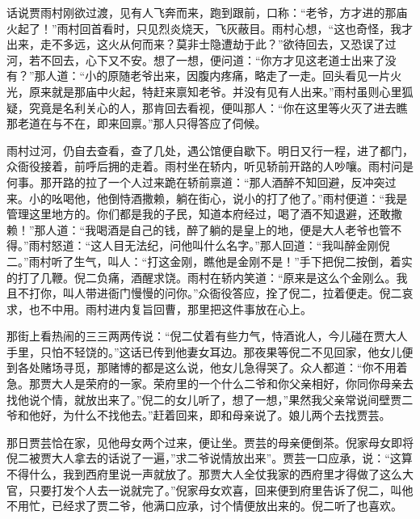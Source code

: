 


\begin{parag}
    话说贾雨村刚欲过渡，见有人飞奔而来，跑到跟前，口称：“老爷，方才进的那庙火起了！”雨村回首看时，只见烈炎烧天，飞灰蔽目。雨村心想，“这也奇怪，我才出来，走不多远，这火从何而来？莫非士隐遭劫于此？”欲待回去，又恐误了过河，若不回去，心下又不安。想了一想，便问道：“你方才见这老道士出来了没有？”那人道：“小的原随老爷出来，因腹内疼痛，略走了一走。回头看见一片火光，原来就是那庙中火起，特赶来禀知老爷。并没有见有人出来。”雨村虽则心里狐疑，究竟是名利关心的人，那肯回去看视，便叫那人：“你在这里等火灭了进去瞧那老道在与不在，即来回禀。”那人只得答应了伺候。
\end{parag}


\begin{parag}
    雨村过河，仍自去查看，查了几处，遇公馆便自歇下。明日又行一程，进了都门，众衙役接着，前呼后拥的走着。雨村坐在轿内，听见轿前开路的人吵嚷。雨村问是何事。那开路的拉了一个人过来跪在轿前禀道：“那人酒醉不知回避，反冲突过来。小的吆喝他，他倒恃酒撒赖，躺在街心，说小的打了他了。”雨村便道：“我是管理这里地方的。你们都是我的子民，知道本府经过，喝了酒不知退避，还敢撒赖！”那人道：“我喝酒是自己的钱，醉了躺的是皇上的地，便是大人老爷也管不得。”雨村怒道：“这人目无法纪，问他叫什么名字。”那人回道：“我叫醉金刚倪二。”雨村听了生气，叫人：“打这金刚，瞧他是金刚不是！”手下把倪二按倒，着实的打了几鞭。倪二负痛，酒醒求饶。雨村在轿内笑道：“原来是这么个金刚么。我且不打你，叫人带进衙门慢慢的问你。”众衙役答应，拴了倪二，拉着便走。倪二哀求，也不中用。雨村进内复旨回曹，那里把这件事放在心上。
\end{parag}


\begin{parag}
    那街上看热闹的三三两两传说：“倪二仗着有些力气，恃酒讹人，今儿碰在贾大人手里，只怕不轻饶的。”这话已传到他妻女耳边。那夜果等倪二不见回家，他女儿便到各处赌场寻觅，那赌博的都是这么说，他女儿急得哭了。众人都道：“你不用着急。那贾大人是荣府的一家。荣府里的一个什么二爷和你父亲相好，你同你母亲去找他说个情，就放出来了。”倪二的女儿听了，想了一想，”果然我父亲常说间壁贾二爷和他好，为什么不找他去。”赶着回来，即和母亲说了。娘儿两个去找贾芸。
\end{parag}


\begin{parag}
    那日贾芸恰在家，见他母女两个过来，便让坐。贾芸的母亲便倒茶。倪家母女即将倪二被贾大人拿去的话说了一遍，”求二爷说情放出来”。贾芸一口应承，说：“这算不得什么，我到西府里说一声就放了。那贾大人全仗我家的西府里才得做了这么大官，只要打发个人去一说就完了。”倪家母女欢喜，回来便到府里告诉了倪二，叫他不用忙，已经求了贾二爷，他满口应承，讨个情便放出来的。倪二听了也喜欢。
\end{parag}


